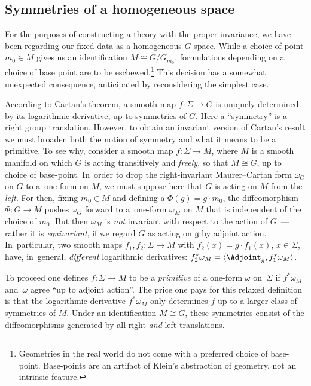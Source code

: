 \subsection*{Symmetries of a homogeneous space}

For the purposes of constructing a theory with the proper invariance,
we have been regarding our fixed data as a homogeneous
$G$-space. While a choice of point $m_0 \in M$ gives us an
identification $M \cong G/G_{m_0}$, formulations depending on a choice
of base point are to be eschewed.\footnote{Geometries in the real
 world do not come with a preferred choice of base-point. Base-points
 are an artifact of Klein's abstraction of geometry, not an intrinsic
 feature.} This decision has a somewhat unexpected consequence,
anticipated by reconsidering the simplest case.

According to Cartan's theorem, a smooth map $f \colon \Sigma
\rightarrow G$ is uniquely determined by its logarithmic derivative,
up to symmetries of $G$. Here a ``symmetry'' is a right group
translation. However, to obtain an invariant version of Cartan's
result we must broaden both the notion of symmetry and what it means
to be a primitive. To see why, consider a smooth map $f \colon \Sigma
\rightarrow M$, where $ M$ is a smooth manifold on which $G$ is acting
transitively and {\em freely}, so that $M \cong G$, up to choice of
base-point. In~order to drop the right-invariant Maurer--Cartan form
$\omega_G$ on $G$ to a~one-form on $ M$, we must suppose here that $G$
is acting on $ M$ from the {\em left}. For then, fixing $ m_0 \in M$
and defining a $\Phi(g) = g \cdot m_0 $, the diffeomorphism $\Phi
\colon G \rightarrow M$ pushes $\omega_G$ forward to a~one-form
$\omega_M $ on $M$ that is independent of the choice of $ m_0$. But
then $\omega_M$ is {\em not} invariant with respect to the action of
$G$~--- rather it is {\em equivariant}, if we regard $G$ as acting on
${\mathfrak g} $ by adjoint action. In~particular, two smooth maps
$f_1, f_2 \colon \Sigma \rightarrow M$ with $f_2(x)=g \cdot f_1(x)$,
$x \in \Sigma $, have, in~general, {\em different} logarithmic
derivatives: $f_2^*\omega_M = \langle\Adjoint_g,f_1^* \omega_M\rangle
$.

To proceed one defines $f \colon \Sigma \rightarrow M$ to be a {\it primitive} of a one-form $\omega $ on~$\Sigma $ if $f^*\omega_M $ and~$\omega $ agree ``up to adjoint action''. The price one pays for this
relaxed definition is that the logarithmic derivative $f^* \omega_M $
only determines $f$ up to a larger class of symmetries of $M$. Under
an identification $M \cong G$, these symmetries consist of the
diffeomorphisms generated by all right {\em and} left translations.

